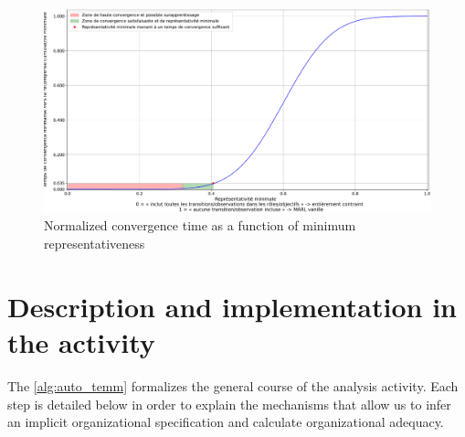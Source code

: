 \begin{figure}[h!]
  \centering
  \includegraphics[trim=0cm 0cm 0cm 0cm, clip, width=1.\linewidth]{figures/convergence_time_relative_to_representativeness.pdf}
  \caption{Normalized convergence time as a function of minimum representativeness}
  \label {fig:conv_time_repr}
\end{figure}




\section{Description and implementation in the activity}

The \autoref{alg:auto_temm} formalizes the general course of the analysis activity.
Each step is detailed below in order to explain the mechanisms that allow us to infer an implicit organizational specification and calculate organizational adequacy.


